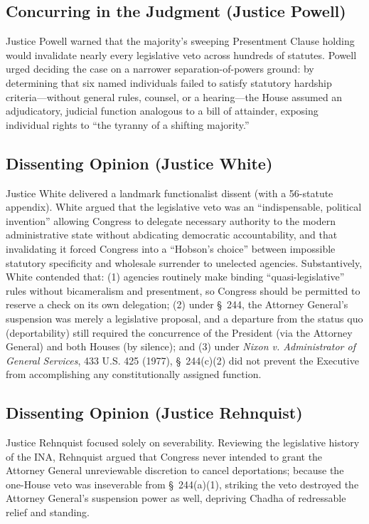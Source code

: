 \documentclass[12pt]{article}
\begin{document}
\subsection{Concurring in the Judgment (Justice Powell)}

Justice Powell warned that the majority's sweeping Presentment Clause holding would invalidate nearly every legislative veto across hundreds of statutes. Powell urged deciding the case on a narrower separation-of-powers ground: by determining that six named individuals failed to satisfy statutory hardship criteria---without general rules, counsel, or a hearing---the House assumed an adjudicatory, judicial function analogous to a bill of attainder, exposing individual rights to ``the tyranny of a shifting majority.''

\subsection{Dissenting Opinion (Justice White)}

Justice White delivered a landmark functionalist dissent (with a 56-statute appendix). White argued that the legislative veto was an ``indispensable, political invention'' allowing Congress to delegate necessary authority to the modern administrative state without abdicating democratic accountability, and that invalidating it forced Congress into a ``Hobson's choice'' between impossible statutory specificity and wholesale surrender to unelected agencies. Substantively, White contended that: (1) agencies routinely make binding ``quasi-legislative'' rules without bicameralism and presentment, so Congress should be permitted to reserve a check on its own delegation; (2) under \S~244, the Attorney General's suspension was merely a legislative proposal, and a departure from the status quo (deportability) still required the concurrence of the President (via the Attorney General) and both Houses (by silence); and (3) under \textit{Nixon v. Administrator of General Services}, 433 U.S. 425 (1977), \S~244(c)(2) did not prevent the Executive from accomplishing any constitutionally assigned function.

\subsection{Dissenting Opinion (Justice Rehnquist)}

Justice Rehnquist focused solely on severability. Reviewing the legislative history of the INA, Rehnquist argued that Congress never intended to grant the Attorney General unreviewable discretion to cancel deportations; because the one-House veto was inseverable from \S~244(a)(1), striking the veto destroyed the Attorney General's suspension power as well, depriving Chadha of redressable relief and standing.
\end{document}
